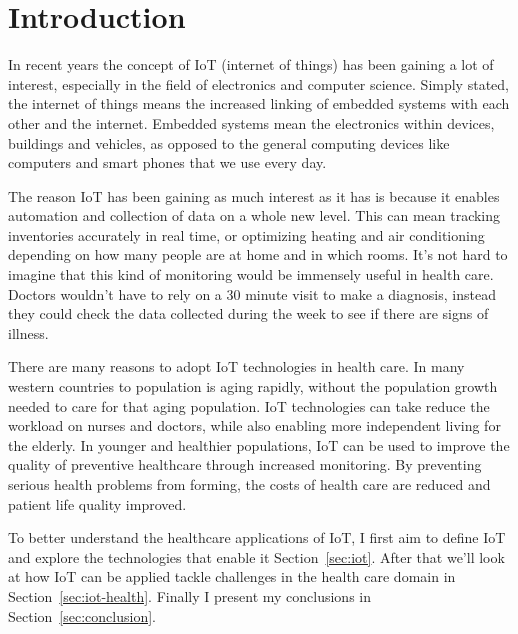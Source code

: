 \section{Introduction}

In recent years the concept of IoT (internet of things) has been gaining a lot
of interest, especially in the field of electronics and computer science.
Simply stated, the internet of things means the increased linking of embedded
systems with each other and the internet. Embedded systems mean the electronics
within devices, buildings and vehicles, as opposed to the general computing
devices like computers and smart phones that we use every day.

The reason IoT has been gaining as much interest as it has is because it
enables automation and collection of data on a whole new level. This can mean
tracking inventories accurately in real time, or optimizing heating and air
conditioning depending on how many people are at home and in which rooms. It's
not hard to imagine that this kind of monitoring would be immensely useful in
health care. Doctors wouldn't have to rely on a 30 minute visit to make a
diagnosis, instead they could check the data collected during the week to see
if there are signs of illness.

There are many reasons to adopt IoT technologies in health care. In many
western countries to population is aging rapidly, without the population growth
needed to care for that aging population. IoT technologies can take reduce the
workload on nurses and doctors, while also enabling more independent living for
the elderly. In younger and healthier populations, IoT can be used to improve
the quality of preventive healthcare through increased monitoring. By
preventing serious health problems from forming, the costs of health care are
reduced and patient life quality improved.

To better understand the healthcare applications of IoT, I first aim to define IoT and
explore the technologies that enable it Section~\ref{sec:iot}. After that we'll
look at how IoT can be applied tackle challenges in the health care domain in
Section~\ref{sec:iot-health}.  Finally I present my conclusions in
Section~\ref{sec:conclusion}.
